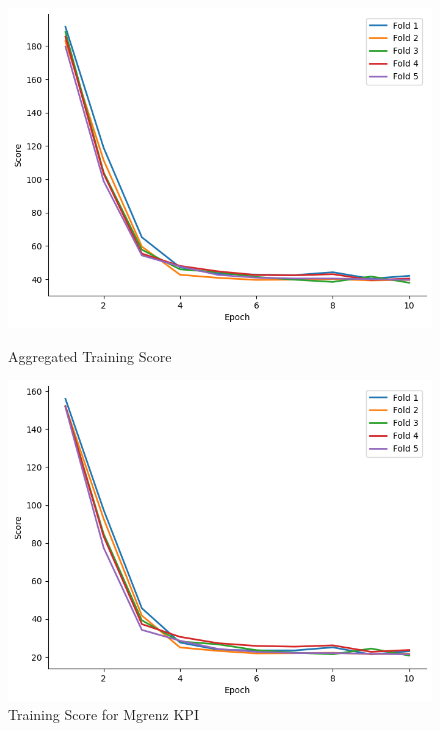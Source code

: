 \documentclass{report} %
\begin{document}
\begin{figure}[H]
    \centering
    \begin{minipage}[b]{0.325\textwidth}
        \includegraphics[width=\textwidth]{./ReportImages/train_score.png}
        \caption{\centering Aggregated Training Score}
        \label{fig:Aggregated Training Score}
    \end{minipage}
    \hfill
    \begin{minipage}[b]{0.325\textwidth}
        \includegraphics[width=\textwidth]{./ReportImages/train_score_y1.png}
        \caption{\centering Training Score for Mgrenz \ac{KPI}}
        \label{fig:Training Score for Torque Curve}
    \end{minipage}

\end{figure}
\end{document}
